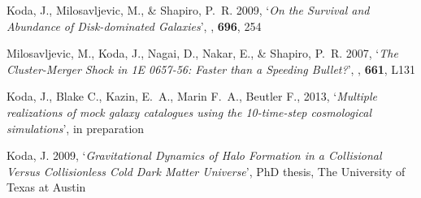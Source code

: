 \begin{thebibliography}{8}
{Koda}, J., {Milosavljevic}, M., \& {Shapiro}, P.~R. 2009{},
  `{\it On the Survival and Abundance of Disk-dominated Galaxies}', {\em \apj\/},
  {\bf 696}, 254 %

{Milosavljevic}, M., {Koda}, J., {Nagai}, D., {Nakar}, E., \& {Shapiro},
  P.~R. 2007, `{\it The Cluster-Merger Shock in 1E 0657-56: Faster than a Speeding
  Bullet?}', {\em \apjl\/}, {\bf 661}, L131 %

\end{thebibliography}

\renewcommand{\refname}{Publications in Preparation}
\begin{thebibliography}{8}
\setcounter{enumiv}{2}

{Koda}, J., {Blake} C., {Kazin}, E.~A., {Marin} F.~A., {Beutler} F., 2013, `{\it Multiple realizations of mock galaxy catalogues using the 10-time-step cosmological simulations}',  in preparation
\end{thebibliography}



\renewcommand{\refname}{PhD Thesis}
\begin{thebibliography}{8}
{Koda}, J. 2009, `{\it Gravitational Dynamics of Halo Formation in a Collisional
  Versus Collisionless Cold Dark Matter Universe}', PhD thesis, The University
  of Texas at Austin
\end{thebibliography}


